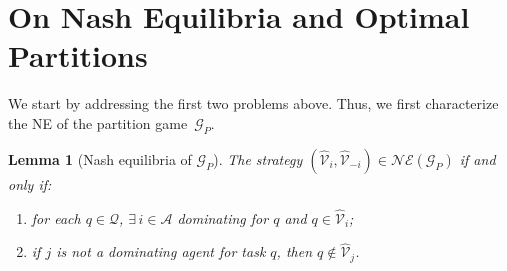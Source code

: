 \documentclass{IEEEtran}
\newcommand{\ldef}{:=}
\newcommand{\Mcal}[1]{\mathcal{#1}}
\newcommand{\Mc}[1]{\mathcal{#1}}
\newcommand{\bld}[1]{\mathbf{#1}}
\newcommand{\thmtitle}[1]{\mbox{}\emph{(#1).}}
\newtheorem{lemma}[theorem]{Lemma}
\renewcommand{\hat}[1]{\widehat{#1}}
\newcommand{\marginn}[1]{\marginpar{\color{blue}\tiny\ttfamily#1}}
\newcommand{\margin}[1]{\marginpar{\color{magenta}\tiny\ttfamily#1}}
\def \agt{\Mcal{A}}
\def \alloc{\Mcal{V}}
\def \alloch{\hat{\alloc}}
\def \game{\mathscr{G}}
\def \ne{\Mc{NE}}
\def \nullset{\varnothing}
\def \salloc{\Mc{P}}
\def \supp{\mathrm{tsupp}\,}
\def \tsk{\Mc{Q}}
\def \w{\bld{w}}
\def \wb{\overline{\w}}
\begin{document}
\section{On Nash Equilibria and Optimal Partitions} \label{sec:ne}

 We start by addressing the first two problems above. %
Thus, 
we first characterize
the NE of the partition game~$\game_P$.
\begin{lemma}[Nash equilibria of $\game_P$] \label{lem:nash_partition_game}
The strategy $(\alloch_i,\alloch_{-i}) \in \ne(\game_P)$ if and only if:%
\begin{enumerate}
\item \label{prop:part_game_dom_agt} for each  $q\in \tsk$, $\exists \, i \in \agt$  dominating for $q$ and $q \in \alloch_i$;
	\item \label{prop:part_game_not_dom_agt} if $j$ is not a dominating agent for task $q$, then $q \not\in \alloch_j $.
\end{enumerate}
\end{lemma}
\end{document}
